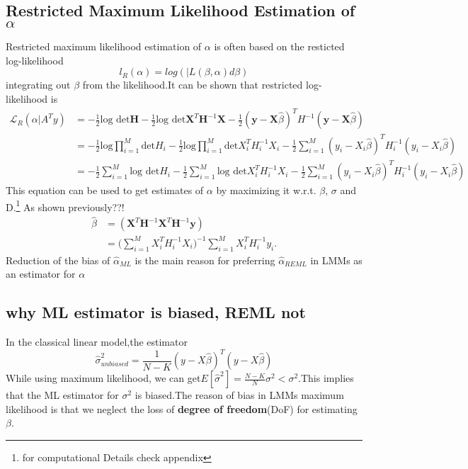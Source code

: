 \documentclass[a4paper,11pt]{article}
\begin{document}
\subsection{Restricted Maximum Likelihood Estimation of $\alpha$}
Restricted maximum likelihood estimation of $\alpha$ is often based on the resticted log-likelihood
\begin{equation}
l_R(\alpha) = log(|L(\beta,\alpha)d\beta)
\end{equation}
integrating out $\beta$ from the likelihood.It can be shown that restricted log-likelihood is 
\begin{equation}\label{eq:2} 
\begin{split}
{\mathcal{L}}_R (\alpha| A^T y) 
&= -\frac{1}{2}\text{log det}\bm{H}-\frac{1}{2}\text{log det}\bm{X}^T\bm{H}^{-1}\bm{X}-\frac{1}{2}(\bm{y}-\bm{X}\widehat{\beta})^TH^{-1}(\bm{y}-\bm{X}\widehat{\beta}) \\
&= -\frac{1}{2}\text{log}\prod_{i=1}^{M} \text{det}H_i-\frac{1}{2}\text{log}\prod_{i=1}^{M} \text{det} X_i^TH_i^{-1}X_i-\frac{1}{2}\sum_{i=1}^{M}(y_i-X_i\widehat{\beta})^TH_i^{-1}(y_i-X_i\widehat{\beta})\\
&= -\frac{1}{2}\sum_{i=1}^{M} \text{log det}H_i-\frac{1}{2}\sum_{i=1}^{M} \text{log det} X_i^TH_i^{-1}X_i-\frac{1}{2}\sum_{i=1}^{M}(y_i-X_i\widehat{\beta})^TH_i^{-1}(y_i-X_i\widehat{\beta})
\end{split}
\end{equation}
This equation can be used to get estimates of $\alpha$ by maximizing it w.r.t. $\beta$, $\sigma$ and D.\footnote{for computational Details check appendix}
As shown previously??! 
\begin{equation}
\begin{split}
\widehat{\beta}&=(\bm{X}^T\bm{H}^{-1}\bm{X}^T\bm{H}^{-1}\bm{y})\\
&=\bigl(\sum_{i=1}^{M}X_i^TH_i^{-1}X_i\bigr)^{-1}\sum_{i=1}^{M}X_i^TH_i^{-1}y_i.
\end{split}
\end{equation}
Reduction of the bias of $\widehat\alpha_{ML}$ is the main reason for preferring $\widehat\alpha_{REML}$ in LMMs as an estimator for $\alpha$

\subsection{why ML estimator is biased, REML not}
In the classical linear model,the estimator 
\begin{equation}
    {\hat{\sigma}}^2_{unbiased} = \frac1{N-K}(y-X\hat{\beta})^T(y-X\hat{\beta})
\end{equation}
While using maximum likelihood, we can get$ E[{\hat{\sigma}}^ 2] = \frac{N-K}{N}\sigma^2<\sigma^2$.This implies that the ML estimator for $\sigma^2$ is biased.The reason of bias in LMMs maximum likelihood is that we neglect the loss of \textbf{degree of freedom}(DoF) for estimating $\beta$.
\end{document}
